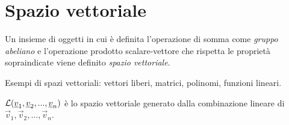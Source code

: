 \section{Spazio vettoriale}
Un insieme di oggetti in cui è definita l'operazione di somma come \emph{gruppo abeliano} e l'operazione
prodotto scalare-vettore che rispetta le proprietà sopraindicate viene definito \emph{spazio vettoriale}.

Esempi di spazi vettoriali: vettori liberi, matrici, polinomi, funzioni lineari.

$\mathcal{L}(\underline{v}_1, \underline{v}_2, ..., \underline{v}_n)$ è lo spazio vettoriale generato dalla combinazione lineare
di $\vec{v}_1, \vec{v}_2, ..., \vec{v}_n$.